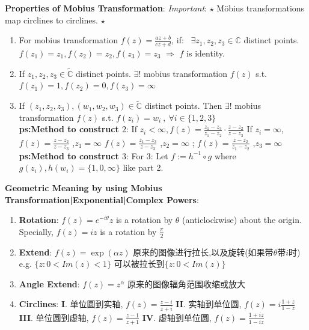 \documentclass[9pt]{article}
\begin{document}
\textbf{Properties of Mobius Transformation}: \textit{Important}: $\star$ Möbius transformations map circlines to circlines. $\star$
\begin{enumerate}[itemsep=-2pt, topsep=-2pt]
    \item For mobius transformation $f(z)=\frac{az+b}{cz+d}$, if: \ $\exists z_1,z_2,z_3\in\mathbb{C}$ distinct points. $f(z_1)=z_1,f(z_2)=z_2,f(z_3)=z_3$ $\Rightarrow$ $f$ is identity.
    \item If $z_1,z_2,z_3\in\widetilde{\mathbb{C}}$ distinct points. \quad $\exists!$ mobius transformation $f(z)$ s.t. $f(z_1)=1,f(z_2)=0,f(z_3)=\infty$
    \item If $(z_1,z_2,z_3),(w_1,w_2,w_3)\in\widetilde{\mathbb{C}}$ distinct points. Then $\exists!$ mobius transformation $f(z)$ s.t. $f(z_i)=w_i \ , \ \forall i\in\{1,2,3\}$ \\
    \textbf{ps:Method to construct $2$}: If $z_i<\infty,f(z)=\frac{z_1-z_3}{z_1-z_2}\cdot\frac{z-z_2}{z-z_3}$ \qquad If $z_i=\infty$, {\footnotesize $f(z)=\frac{z-z_2}{z-z_3}$ {\scriptsize ,$z_1=\infty$} $f(z)=\frac{z_1-z_3}{z-z_3}$ {\scriptsize ,$z_2=\infty$} ; $f(z)=\frac{z-z_2}{z_1-z_2}$ {\scriptsize ,$z_3=\infty$} } \\
    \textbf{ps:Method to construct $3$}: For 3: Let $f:=h^{-1}\circ g$ {\footnotesize where $g(z_i),h(w_i)=\{1,0,\infty\}$ like part 2.}
    \vspace{1.5pt}
\end{enumerate}

\textbf{Geometric Meaning by using Mobius Transformation|Exponential|Complex Powers}:

\begin{enumerate}[itemsep=-2pt, topsep=-2pt]
    \item \textbf{Rotation}: $f(z)=e^{-i\theta}z$ is a rotation by $\theta$ (anticlockwise) about the origin. \qquad Specially, $f(z)=iz$ is a rotation by $\frac{\pi}{2}$
    \item \textbf{Extend}: $f(z)=\exp(\alpha z)$ {\small 原来的图像进行拉长,以及旋转(如果带$\theta$带$i$时)} e.g. $\{z:0<Im(z)<1\}$ {\small 可以被拉长到$\{z:0<Im(z)\}$}
    \item \textbf{Angle Extend}: $f(z)=z^{\alpha}$ {\small 原来的图像辐角范围收缩或放大}
    \item \textbf{Circlines}: \textbf{I}. 单位圆到实轴, $f(z)=\frac{z-i}{z+i}$ \quad \textbf{II}. 实轴到单位圆, $f(z)=i\frac{1+z}{1-z}$ \\
          \hspace{50pt} \textbf{III}. 单位圆到虚轴, $f(z)=\frac{z-1}{z+1}$ \quad \textbf{IV}. 虚轴到单位圆, $f(z)=\frac{1+iz}{1-iz}$
\end{enumerate} 
\end{document}
